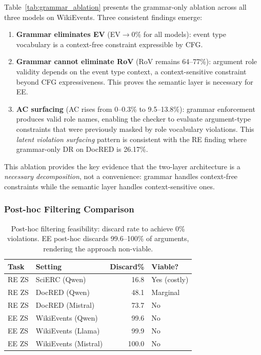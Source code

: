 \documentclass[11pt]{article}
\begin{document}
Table~\ref{tab:grammar_ablation} presents the grammar-only ablation across all three models on WikiEvents.
Three consistent findings emerge:

\begin{enumerate}[nosep,leftmargin=*]
\item \textbf{Grammar eliminates EV} (EV$\to$0\% for all models): event type vocabulary is a context-free constraint expressible by CFG.
\item \textbf{Grammar cannot eliminate RoV} (RoV remains 64--77\%): argument role validity depends on the event type context, a context-sensitive constraint beyond CFG expressiveness. This proves the semantic layer is necessary for EE.
\item \textbf{AC surfacing} (AC rises from 0--0.3\% to 9.5--13.8\%): grammar enforcement produces valid role names, enabling the checker to evaluate argument-type constraints that were previously masked by role vocabulary violations. This \emph{latent violation surfacing} pattern is consistent with the RE finding where grammar-only DR on DocRED is 26.17\%.
\end{enumerate}

This ablation provides the key evidence that the two-layer architecture is a \emph{necessary decomposition}, not a convenience: grammar handles context-free constraints while the semantic layer handles context-sensitive ones.

\subsubsection{Post-hoc Filtering Comparison}

\begin{table}[t]
\centering
\caption{Post-hoc filtering feasibility: discard rate to achieve 0\% violations. EE post-hoc discards 99.6--100\% of arguments, rendering the approach non-viable.}
\label{tab:posthoc}
\small
\begin{tabular}{llrl}
\toprule
\textbf{Task} & \textbf{Setting} & \textbf{Discard\%} & \textbf{Viable?} \\
\midrule
RE ZS & SciERC (Qwen) & 16.8 & Yes (costly) \\
RE ZS & DocRED (Qwen) & 48.1 & Marginal \\
RE ZS & DocRED (Mistral) & 73.7 & No \\
\midrule
EE ZS & WikiEvents (Qwen) & 99.6 & No \\
EE ZS & WikiEvents (Llama) & 99.9 & No \\
EE ZS & WikiEvents (Mistral) & 100.0 & No \\
\bottomrule
\end{tabular}
\end{table}
\end{document}
